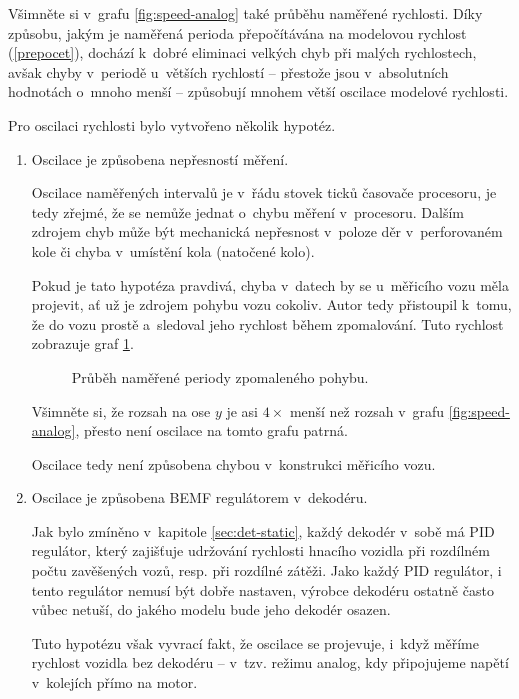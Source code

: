 Všimněte si v~grafu \ref{fig:speed-analog} také průběhu naměřené rychlosti.
Díky způsobu, jakým je naměřená perioda přepočítávána na modelovou rychlost
(\ref{prepocet}), dochází k~dobré eliminaci velkých chyb při malých rychlostech,
avšak chyby v~periodě u~větších rychlostí -- přestože jsou v~absolutních
hodnotách o~mnoho menší -- způsobují mnohem větší oscilace modelové rychlosti.

Pro oscilaci rychlosti bylo vytvořeno několik hypotéz.

\begin{enumerate}
\item Oscilace je způsobena nepřesností měření.

Oscilace naměřených intervalů je v~řádu stovek ticků časovače procesoru, je tedy
zřejmé, že se nemůže jednat o~chybu měření v~procesoru. Dalším zdrojem chyb
může být mechanická nepřesnost v~poloze děr v~perforovaném kole či chyba
v~umístění kola (natočené kolo).

Pokud je tato hypotéza pravdivá, chyba v~datech by se u~měřicího vozu měla
projevit, ať už je zdrojem pohybu vozu cokoliv. Autor tedy přistoupil k~tomu,
že do vozu prostě  a~sledoval jeho rychlost během zpomalování.
Tuto rychlost zobrazuje graf \ref{fig:speed-zduch}.

\begin{figure}[ht]

\caption{Průběh naměřené periody zpomaleného pohybu.}
\label{fig:speed-zduch}
\end{figure}

Všimněte si, že rozsah na ose $y$ je asi $4 \times$ menší než rozsah v~grafu
\ref{fig:speed-analog}, přesto není oscilace na tomto grafu patrná.

Oscilace tedy není způsobena chybou v~konstrukci měřicího vozu.

\item Oscilace je způsobena \gls{BEMF} regulátorem v~dekodéru.

Jak bylo zmíněno v~kapitole \ref{sec:det-static}, každý dekodér v~sobě má PID
regulátor, který zajišťuje udržování rychlosti hnacího vozidla při rozdílném
počtu zavěšených vozů, resp. při rozdílné zátěži. Jako každý PID regulátor,
i tento regulátor nemusí být dobře nastaven, výrobce dekodéru ostatně často
vůbec netuší, do jakého modelu bude jeho dekodér osazen.

Tuto hypotézu však vyvrací fakt, že oscilace se projevuje, i~když měříme
rychlost vozidla bez dekodéru -- v~tzv. režimu analog, kdy připojujeme napětí
v~kolejích přímo na motor.


\end{enumerate}
